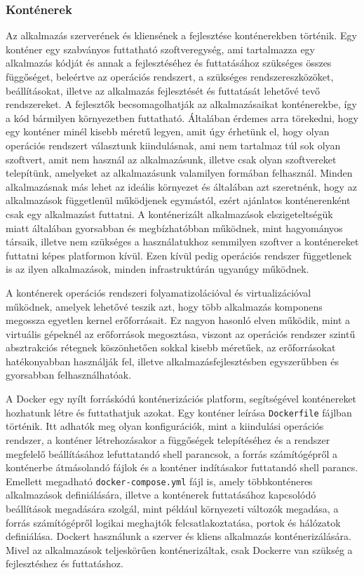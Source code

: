 \documentclass{elteikthesis}
\begin{document}
				\subsubsection{Konténerek}
					Az alkalmazás szerverének és kliensének a fejlesztése konténerekben történik. Egy konténer \cite{containers} egy szabványos futtatható szoftveregység, ami tartalmazza egy alkalmazás kódját és annak a fejlesztéséhez és futtatásához szükséges összes függőséget, beleértve az operációs rendszert, a szükséges rendszereszközöket, beállításokat, illetve az alkalmazás fejlesztését és futtatását lehetővé tevő rendszereket. A fejlesztők becsomagolhatják az alkalmazásaikat konténerekbe, így a kód bármilyen környezetben futtatható. Általában érdemes arra törekedni, hogy egy konténer minél kisebb méretű legyen, amit úgy érhetünk el, hogy olyan operációs rendszert választunk kiindulásnak, ami nem tartalmaz túl sok olyan szoftvert, amit nem használ az alkalmazásunk, illetve csak olyan szoftvereket telepítünk, amelyeket az alkalmazásunk valamilyen formában felhasznál. Minden alkalmazásnak más lehet az ideális környezet és általában azt szeretnénk, hogy az alkalmazások függetlenül működjenek egymástól, ezért ajánlatos konténerenként csak egy alkalmazást futtatni. A konténerizált alkalmazások elszigeteltségük miatt általában gyorsabban és megbízhatóbban működnek, mint hagyományos társaik, illetve nem szükséges a használatukhoz semmilyen szoftver a konténereket futtatni képes platformon kívül. Ezen kívül pedig operációs rendszer függetlenek is az ilyen alkalmazások, minden infrastruktúrán ugyanúgy működnek.

					A konténerek operációs rendszeri folyamatizolációval és virtualizációval működnek, amelyek lehetővé teszik azt, hogy több alkalmazás komponens megossza egyetlen kernel erőforrásait. Ez nagyon hasonló elven működik, mint a virtuális gépeknél az erőforrások megosztása, viszont az operációs rendszer szintű absztrakciós rétegnek köszönhetően sokkal kisebb méretűek, az erőforrásokat hatékonyabban használják fel, illetve alkalmazásfejlesztésben egyszerűbben és gyorsabban felhasználhatóak.

					A Docker \cite{docker} egy nyílt forráskódú konténerizációs platform, segítségével konténereket hozhatunk létre és futtathatjuk azokat. Egy konténer leírása \texttt{Dockerfile} fájlban történik. Itt adhatók meg olyan konfigurációk, mint a kiindulási operációs rendszer, a konténer létrehozásakor a függőségek telepítéséhez és a rendszer megfelelő beállításához lefuttatandó shell parancsok, a forrás számítógépről a konténerbe átmásolandó fájlok és a konténer indításakor futtatandó shell parancs. Emellett megadható \texttt{docker-compose.yml} fájl is, amely többkonténeres alkalmazások definiálására, illetve a konténerek futtatásához kapcsolódó beállítások megadására szolgál, mint például környezeti változók megadása, a forrás számítógépről logikai meghajtók felcsatlakoztatása, portok és hálózatok definiálása. Dockert használunk a szerver és kliens alkalmazás konténerizálására. Mivel az alkalmazások teljeskörűen konténerizáltak, csak Dockerre van szükség a fejlesztéshez és futtatáshoz.
\end{document}

